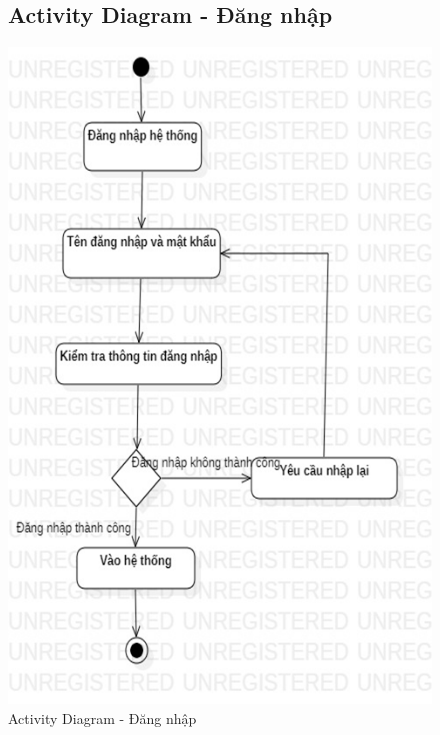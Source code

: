 \documentclass{report}
\begin{document}
\begin{center}
	\begin{figure}[!htp]
		\subsection{Activity Diagram - Đăng nhập}
		\begin{center}
			\includegraphics[scale=1]{Hinh/Activity diagram Đăng nhập.png}
		\end{center}
		\caption{Activity Diagram - Đăng nhập}
	\end{figure}
\end{center}
\end{document}
